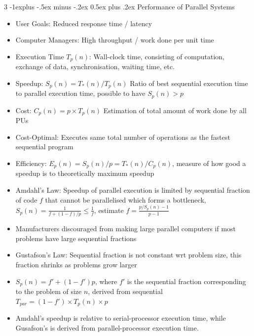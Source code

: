 \documentclass[10pt, landscape]{article}
\makeatletter
\renewcommand{\section}{\@startsection{section}{1}{0mm}%
                                {-1ex plus -.5ex minus -.2ex}%
                                {0.5ex plus .2ex}%
                                {\normalfont\large\bfseries}}
\renewcommand{\section}{\@startsection{section}{2}{0mm}%
                                {-1explus -.5ex minus -.2ex}%
                                {0.5ex plus .2ex}%
                                {\normalfont\normalsize\bfseries}}
\makeatother
\begin{document}
\begin{multicols*}{3}
\section{Performance of Parallel Systems}
\begin{itemize}
    \item User Goals: Reduced response time / latency
    \item Computer Managers: High throughput / work done per unit time
    \item Execution Time $T_p(n)$: Wall-clock time, consisting of computation, exchange of data, synchronisation, waiting time, etc.
    \item Speedup: $S_p(n)=T_*(n)/T_p(n)$ Ratio of best sequential execution time to parallel execution time, possible to have $S_p(n) > p$
    \item Cost: $C_p(n)=p \times T_p(n)$ Estimation of total amount of work done by all PUs
    \item Cost-Optimal: Executes same total number of operations as the fastest sequential program
    \item Efficiency: $E_p(n)=S_p(n)/p=T_*(n)/C_p(n)$, measure of how good a speedup is to theoretically maximum speedup
    \item Amdahl's Law: Speedup of parallel execution is limited by sequential fraction of code $f$ that cannot be parallelised which forms a bottleneck, $S_p(n)=\frac{1}{f+(1-f)/p}\leq \frac{1}{f}$, estimate $f=\frac{p/S_p(n)-1}{p-1}$
    \item Manufacturers discouraged from making large parallel computers if most problems have large sequential fractions
    \item Gustafson's Law: Sequential fraction is not constant wrt problem size, this fraction shrinks as problems grow larger
    \item $S_p(n)=f'+(1-f')p$, where $f'$ is the sequential fraction corresponding to the problem of size $n$, derived from sequential $T_{par}=(1-f') \times T_p(n) \times p$
    \item Amdahl's speedup is relative to serial-processor execution time, while Gusafson's is derived from parallel-processor execution time.
\end{itemize}


\end{multicols*}
\end{document}
